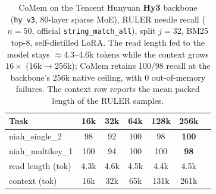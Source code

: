 \begin{table}[!htbp]
\centering
\small
\begin{tabular}{@{}lcccccc@{}}
\toprule
\textbf{Task} & 16k & 32k & 64k & 128k & 256k \\
\midrule
niah\_single\_2   &  98 & 92 & 100 &  98 & \textbf{100} \\
niah\_multikey\_1 & 100 & 94 & 100 & 100 & \textbf{98} \\
\midrule
read length (tok) & 4.3k & 4.6k & 4.5k & 4.4k & 4.5k \\
context (tok)     & 16k  & 32k  & 65k  & 131k & 261k \\
\bottomrule
\end{tabular}
\caption{CoMem on the Tencent Hunyuan \textbf{Hy3} backbone (\texttt{hy\_v3},
80-layer sparse MoE), RULER needle recall ($n{=}50$, official
\texttt{string\_match\_all}), split $j{=}32$, BM25 top-$8$, self-distilled LoRA.
The read length fed to the model stays $\approx$4.3--4.6k tokens while the
context grows $16\times$ (16k$\to$256k); CoMem retains 100/98 recall at the
backbone's 256k native ceiling, with $0$ out-of-memory failures. The context row
reports the mean packed length of the RULER samples.}
\label{tab:hy3ruler}
\end{table}
